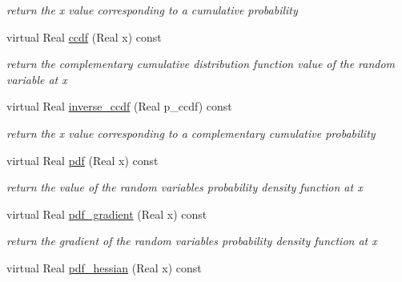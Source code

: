 \begin{DoxyCompactItemize}
\begin{DoxyCompactList}\small\item\em return the x value corresponding to a cumulative probability \end{DoxyCompactList}\item 
virtual Real \hyperlink{classPecos_1_1RandomVariable_a23c3b599e7e4788a9a5e9e93c3dbaf4d}{ccdf} (Real x) const \label{classPecos_1_1RandomVariable_a23c3b599e7e4788a9a5e9e93c3dbaf4d}

\begin{DoxyCompactList}\small\item\em return the complementary cumulative distribution function value of the random variable at x \end{DoxyCompactList}\item 
virtual Real \hyperlink{classPecos_1_1RandomVariable_afda003a1f59ff6930902cd5c8601f49b}{inverse\+\_\+ccdf} (Real p\+\_\+ccdf) const \label{classPecos_1_1RandomVariable_afda003a1f59ff6930902cd5c8601f49b}

\begin{DoxyCompactList}\small\item\em return the x value corresponding to a complementary cumulative probability \end{DoxyCompactList}\item 
virtual Real \hyperlink{classPecos_1_1RandomVariable_a8ec69265f428e17c1707133cb137a819}{pdf} (Real x) const \label{classPecos_1_1RandomVariable_a8ec69265f428e17c1707133cb137a819}

\begin{DoxyCompactList}\small\item\em return the value of the random variable\textquotesingle{}s probability density function at x \end{DoxyCompactList}\item 
virtual Real \hyperlink{classPecos_1_1RandomVariable_aaa7ca3718abc034be7629af5594efca0}{pdf\+\_\+gradient} (Real x) const \label{classPecos_1_1RandomVariable_aaa7ca3718abc034be7629af5594efca0}

\begin{DoxyCompactList}\small\item\em return the gradient of the random variable\textquotesingle{}s probability density function at x \end{DoxyCompactList}\item 
virtual Real \hyperlink{classPecos_1_1RandomVariable_a514a0abe97269ac6e003f43683d9137e}{pdf\+\_\+hessian} (Real x) const \label{classPecos_1_1RandomVariable_a514a0abe97269ac6e003f43683d9137e}


\end{DoxyCompactItemize}
